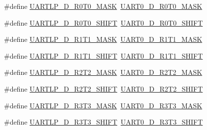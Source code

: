 \begin{DoxyCompactItemize}
\item 
\#define \hyperlink{group___backward___compatibility___symbols_ga6c0de61b1bd7ca4438ffc57fe10550ef}{U\+A\+R\+T\+L\+P\+\_\+\+D\+\_\+\+R0\+T0\+\_\+\+M\+A\+SK}~\hyperlink{group___u_a_r_t0___register___masks_gafb52d25fd02d9e7f20c4e2c15b1b4582}{U\+A\+R\+T0\+\_\+\+D\+\_\+\+R0\+T0\+\_\+\+M\+A\+SK}
\item 
\#define \hyperlink{group___backward___compatibility___symbols_gab2cd42b68d606b5ba4d1b496d41a9a1a}{U\+A\+R\+T\+L\+P\+\_\+\+D\+\_\+\+R0\+T0\+\_\+\+S\+H\+I\+FT}~\hyperlink{group___u_a_r_t0___register___masks_gad74330f7b3c879005943f6bfb6641578}{U\+A\+R\+T0\+\_\+\+D\+\_\+\+R0\+T0\+\_\+\+S\+H\+I\+FT}
\item 
\#define \hyperlink{group___backward___compatibility___symbols_ga5ee9734a722b015b5cf6a8f0f242445b}{U\+A\+R\+T\+L\+P\+\_\+\+D\+\_\+\+R1\+T1\+\_\+\+M\+A\+SK}~\hyperlink{group___u_a_r_t0___register___masks_ga814724f492eb31ac3d56cf7b4c639cdf}{U\+A\+R\+T0\+\_\+\+D\+\_\+\+R1\+T1\+\_\+\+M\+A\+SK}
\item 
\#define \hyperlink{group___backward___compatibility___symbols_ga9ae77e2a0f335113ae450295a927aafe}{U\+A\+R\+T\+L\+P\+\_\+\+D\+\_\+\+R1\+T1\+\_\+\+S\+H\+I\+FT}~\hyperlink{group___u_a_r_t0___register___masks_ga1032022de13132a13b5e09a30839b493}{U\+A\+R\+T0\+\_\+\+D\+\_\+\+R1\+T1\+\_\+\+S\+H\+I\+FT}
\item 
\#define \hyperlink{group___backward___compatibility___symbols_ga5e511688ca9d65b6f298ecf4c9983f92}{U\+A\+R\+T\+L\+P\+\_\+\+D\+\_\+\+R2\+T2\+\_\+\+M\+A\+SK}~\hyperlink{group___u_a_r_t0___register___masks_gaa584f3ebf164a497e3008771d511fc7b}{U\+A\+R\+T0\+\_\+\+D\+\_\+\+R2\+T2\+\_\+\+M\+A\+SK}
\item 
\#define \hyperlink{group___backward___compatibility___symbols_ga9c26b19d89d75331664cd34366569eaa}{U\+A\+R\+T\+L\+P\+\_\+\+D\+\_\+\+R2\+T2\+\_\+\+S\+H\+I\+FT}~\hyperlink{group___u_a_r_t0___register___masks_ga8fbb4283aa79977ed0f576dfd3960f64}{U\+A\+R\+T0\+\_\+\+D\+\_\+\+R2\+T2\+\_\+\+S\+H\+I\+FT}
\item 
\#define \hyperlink{group___backward___compatibility___symbols_ga147acf9d25c9aed961994759b4a09adf}{U\+A\+R\+T\+L\+P\+\_\+\+D\+\_\+\+R3\+T3\+\_\+\+M\+A\+SK}~\hyperlink{group___u_a_r_t0___register___masks_gadfa2cd1862bf6eb53ee9ac5da895aafe}{U\+A\+R\+T0\+\_\+\+D\+\_\+\+R3\+T3\+\_\+\+M\+A\+SK}
\item 
\#define \hyperlink{group___backward___compatibility___symbols_ga71795a0a7638b19ce28c042efd756c10}{U\+A\+R\+T\+L\+P\+\_\+\+D\+\_\+\+R3\+T3\+\_\+\+S\+H\+I\+FT}~\hyperlink{group___u_a_r_t0___register___masks_ga8b40852e3caf9131f78ca2a2238c5a5d}{U\+A\+R\+T0\+\_\+\+D\+\_\+\+R3\+T3\+\_\+\+S\+H\+I\+FT}

\end{DoxyCompactItemize}
